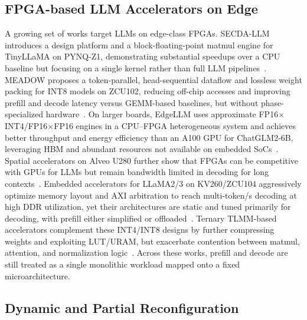 \documentclass[9pt,sigconf]{acmart}
\begin{document}
\subsection{FPGA-based LLM Accelerators on Edge}

A growing set of works target LLMs on edge-class FPGAs. SECDA-LLM introduces a design platform and a block-floating-point matmul engine for TinyLLaMA on PYNQ-Z1, demonstrating substantial speedups over a CPU baseline but focusing on a single kernel rather than full LLM pipelines~\cite{haris2024secda}. MEADOW proposes a token-parallel, head-sequential dataflow and lossless weight packing for INT8 models on ZCU102, reducing off-chip accesses and improving prefill and decode latency versus GEMM-based baselines, but without phase-specialized hardware~\cite{moitra2025meadow}. On larger boards, EdgeLLM uses approximate FP16$\times$INT4/FP16$\times$FP16 engines in a CPU--FPGA heterogeneous system and achieves better throughput and energy efficiency than an A100 GPU for ChatGLM2-6B, leveraging HBM and abundant resources not available on embedded SoCs~\cite{huang2024edgellm}. Spatial accelerators on Alveo U280 further show that FPGAs can be competitive with GPUs for LLMs but remain bandwidth limited in decoding for long contexts~\cite{chen2023spatial}. Embedded accelerators for LLaMA2/3 on KV260/ZCU104 aggressively optimize memory layout and AXI arbitration to reach multi-token/s decoding at high DDR utilization, yet their architectures are static and tuned primarily for decoding, with prefill either simplified or offloaded~\cite{li2025pushing,li2025hummingbird}. Ternary TLMM-based accelerators complement these INT4/INT8 designs by further compressing weights and exploiting LUT/URAM, but exacerbate contention between matmul, attention, and normalization logic~\cite{qiao2025tellmev2}. Across these works, prefill and decode are still treated as a single monolithic workload mapped onto a fixed microarchitecture.

\subsection{Dynamic and Partial Reconfiguration}
\end{document}
